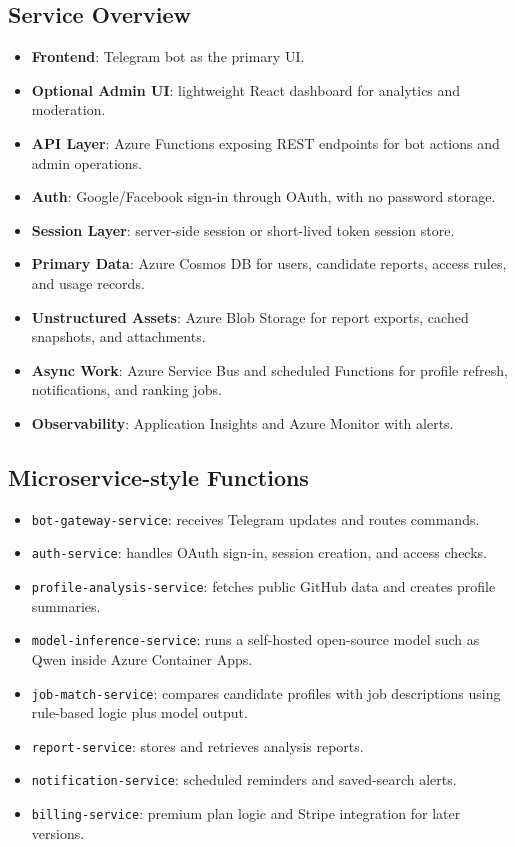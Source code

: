 \documentclass[11pt]{article}
\begin{document}
\subsection{Service Overview}
\begin{itemize}[leftmargin=*]
  \item \textbf{Frontend}: Telegram bot as the primary UI.
  \item \textbf{Optional Admin UI}: lightweight React dashboard for analytics and moderation.
  \item \textbf{API Layer}: Azure Functions exposing REST endpoints for bot actions and admin operations.
  \item \textbf{Auth}: Google/Facebook sign-in through OAuth, with no password storage.
  \item \textbf{Session Layer}: server-side session or short-lived token session store.
  \item \textbf{Primary Data}: Azure Cosmos DB for users, candidate reports, access rules, and usage records.
  \item \textbf{Unstructured Assets}: Azure Blob Storage for report exports, cached snapshots, and attachments.
  \item \textbf{Async Work}: Azure Service Bus and scheduled Functions for profile refresh, notifications, and ranking jobs.
  \item \textbf{Observability}: Application Insights and Azure Monitor with alerts.
\end{itemize}

\subsection{Microservice-style Functions}
\begin{itemize}[leftmargin=*]
  \item \texttt{bot-gateway-service}: receives Telegram updates and routes commands.
  \item \texttt{auth-service}: handles OAuth sign-in, session creation, and access checks.
  \item \texttt{profile-analysis-service}: fetches public GitHub data and creates profile summaries.
  \item \texttt{model-inference-service}: runs a self-hosted open-source model such as Qwen inside Azure Container Apps.
  \item \texttt{job-match-service}: compares candidate profiles with job descriptions using rule-based logic plus model output.
  \item \texttt{report-service}: stores and retrieves analysis reports.
  \item \texttt{notification-service}: scheduled reminders and saved-search alerts.
  \item \texttt{billing-service}: premium plan logic and Stripe integration for later versions.
\end{itemize}
\end{document}
